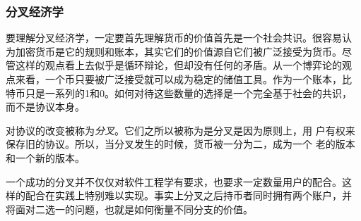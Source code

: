 \documentclass[letterpaper]{article}
\begin{document}
\subsubsection{分叉经济学}

要理解分叉经济学，一定要首先理解货币的价值首先是一个社会共识。很容易认
为加密货币是它的规则和账本，其实它们的价值源自它们被广泛接受为货币。尽
管这样的观点看上去似乎是循环辩论，但却没有任何的矛盾。从一个博弈论的观
点来看，一个币只要被广泛接受就可以成为稳定的储值工具。作为一个账本，比
特币只是一系列的1和0。如何对待这些数量的选择是一个完全基于社会的共识，
而不是协议本身。

对协议的改变被称为\emph{分叉}。它们之所以被称为是分叉是因为原则上，用
户有权来保存旧的协议。所以，当分叉发生的时候，货币被一分为二，成为一个
老的版本和一个新的版本。

一个成功的分叉并不仅仅对软件工程学有要求，也要求一定数量用户的配合。这
样的配合在实践上特别难以实现。事实上分叉之后持币者同时拥有两个账户，并
将面对二选一的问题，也就是如何衡量不同分支的价值。
\end{document}
